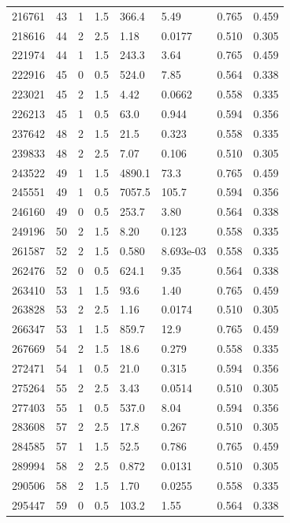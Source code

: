 \documentclass[preview]{standalone}
\begin{document}
{{{\begin{tabular}{L{1.2cm}C{1.2cm} C{0.3cm}C{0.5cm} C{1.4cm}C{1.4cm} C{1.4cm}C{1.4cm}}
  216761  &    43  & 1     & 1.5 &  366.4  & 5.49  & 0.765 &  0.459   \\ 
  218616  &    44  & 2     & 2.5 &  1.18  & 0.0177  & 0.510 &  0.305   \\ 
  221974  &    44  & 1     & 1.5 &  243.3  & 3.64  & 0.765 &  0.459   \\ 
  222916  &    45  & 0     & 0.5 &  524.0  & 7.85  & 0.564 &  0.338   \\ 
  223021  &    45  & 2     & 1.5 &  4.42  & 0.0662  & 0.558 &  0.335   \\ 
  226213  &    45  & 1     & 0.5 &  63.0  & 0.944  & 0.594 &  0.356   \\ 
  237642  &    48  & 2     & 1.5 &  21.5  & 0.323  & 0.558 &  0.335   \\ 
  239833  &    48  & 2     & 2.5 &  7.07  & 0.106  & 0.510 &  0.305   \\ 
  243522  &    49  & 1     & 1.5 &  4890.1  & 73.3  & 0.765 &  0.459   \\ 
  245551  &    49  & 1     & 0.5 &  7057.5  & 105.7  & 0.594 &  0.356   \\ 
  246160  &    49  & 0     & 0.5 &  253.7  & 3.80  & 0.564 &  0.338   \\ 
  249196  &    50  & 2     & 1.5 &  8.20  & 0.123  & 0.558 &  0.335   \\ 
  261587  &    52  & 2     & 1.5 &  0.580  & 8.693e-03  & 0.558 &  0.335   \\ 
  262476  &    52  & 0     & 0.5 &  624.1  & 9.35  & 0.564 &  0.338   \\ 
  263410  &    53  & 1     & 1.5 &  93.6  & 1.40  & 0.765 &  0.459   \\ 
  263828  &    53  & 2     & 2.5 &  1.16  & 0.0174  & 0.510 &  0.305   \\ 
  266347  &    53  & 1     & 1.5 &  859.7  & 12.9  & 0.765 &  0.459   \\ 
  267669  &    54  & 2     & 1.5 &  18.6  & 0.279  & 0.558 &  0.335   \\ 
  272471  &    54  & 1     & 0.5 &  21.0  & 0.315  & 0.594 &  0.356   \\ 
  275264  &    55  & 2     & 2.5 &  3.43  & 0.0514  & 0.510 &  0.305   \\ 
  277403  &    55  & 1     & 0.5 &  537.0  & 8.04  & 0.594 &  0.356   \\ 
  283608  &    57  & 2     & 2.5 &  17.8  & 0.267  & 0.510 &  0.305   \\ 
  284585  &    57  & 1     & 1.5 &  52.5  & 0.786  & 0.765 &  0.459   \\ 
  289994  &    58  & 2     & 2.5 &  0.872  & 0.0131  & 0.510 &  0.305   \\ 
  290506  &    58  & 2     & 1.5 &  1.70  & 0.0255  & 0.558 &  0.335   \\ 
  295447  &    59  & 0     & 0.5 &  103.2  & 1.55  & 0.564 &  0.338   \\ 
\hline 
\end{tabular} 

}}}
\end{document}
